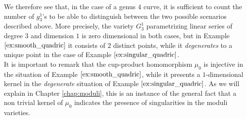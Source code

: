  	We therefore see that, in the case of a genus $4$ curve, it is sufficient to count the number of $g_3^1$'s to be able to distinguish between the two possible scenarios described above. More precisely, the variety $G_3^1$ parametrizing linear series of degree $3$ and dimension $1$ is zero dimensional in both cases, but in Example $\ref{ex:smooth_quadric}$ it consists of $2$ distinct points, while it \emph{degenerates} to a unique point in the case of Example $\ref{ex:singular_quadric}$.\\
 	It is important to remark that the cup-product homomorphism $\mu_0$ is injective in the situation of Example $\ref{ex:smooth_quadric}$, while it presents a $1$-dimensional kernel in the \emph{degenerate} situation of Example $\ref{ex:singular_quadric}$. As we will explain in Chapter \ref{chap:moduli}, this is an instance of the general fact that a non trivial kernel of $\mu_0$ indicates the presence of singularities in the moduli varieties.\\


	




